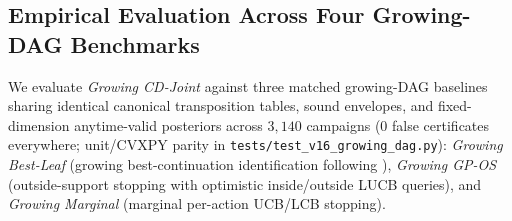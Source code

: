\documentclass{article}
\theoremstyle{plain}
\theoremstyle{definition}
\begin{document}
\subsection{Empirical Evaluation Across Four Growing-DAG Benchmarks}
\label{app:growing-results}

We evaluate \emph{Growing CD-Joint} against three matched growing-DAG baselines sharing identical canonical transposition tables, sound envelopes, and fixed-dimension anytime-valid posteriors across $3{,}140$ campaigns ($0$ false certificates everywhere; unit/CVXPY parity in \texttt{tests/test\_v16\_growing\_dag.py}): \emph{Growing Best-Leaf} (growing best-continuation identification following \citealt{pelissier}), \emph{Growing GP-OS} (outside-support stopping with optimistic inside/outside LUCB queries), and \emph{Growing Marginal} (marginal per-action UCB/LCB stopping).
\end{document}
